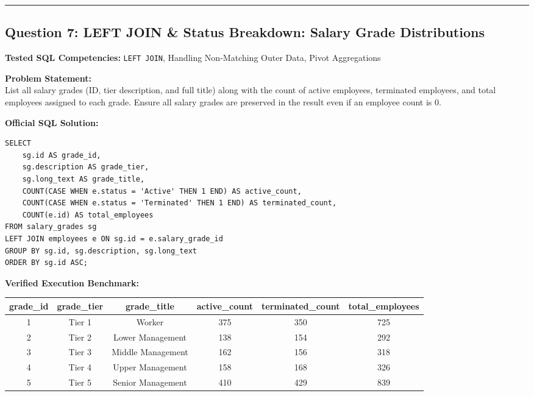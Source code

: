 \documentclass[11pt,a4paper]{article}
\begin{document}
\vspace{0.4cm}
\noindent\rule{\textwidth}{0.4pt}
\vspace{0.4cm}

\subsection*{Question 7: LEFT JOIN & Status Breakdown: Salary Grade Distributions}

\noindent\textbf{Tested SQL Competencies:} \texttt{LEFT JOIN}, Handling Non-Matching Outer Data, Pivot Aggregations

\vspace{0.15cm}
\noindent\textbf{Problem Statement:} \\
List all salary grades (ID, tier description, and full title) along with the count of active employees, terminated employees, and total employees assigned to each grade. Ensure all salary grades are preserved in the result even if an employee count is 0.

\vspace{0.25cm}
\noindent\textbf{Official SQL Solution:}
\begin{verbatim}
SELECT 
    sg.id AS grade_id,
    sg.description AS grade_tier,
    sg.long_text AS grade_title,
    COUNT(CASE WHEN e.status = 'Active' THEN 1 END) AS active_count,
    COUNT(CASE WHEN e.status = 'Terminated' THEN 1 END) AS terminated_count,
    COUNT(e.id) AS total_employees
FROM salary_grades sg
LEFT JOIN employees e ON sg.id = e.salary_grade_id
GROUP BY sg.id, sg.description, sg.long_text
ORDER BY sg.id ASC;
\end{verbatim}

\vspace{0.15cm}
\noindent\textbf{Verified Execution Benchmark:}
\begin{center}
\small
\begin{tabular}{cccccc}
\toprule
\textbf{grade\_id} & \textbf{grade\_tier} & \textbf{grade\_title} & \textbf{active\_count} & \textbf{terminated\_count} & \textbf{total\_employees} \\
\midrule
1 & Tier 1 & Worker & 375 & 350 & 725 \\
2 & Tier 2 & Lower Management & 138 & 154 & 292 \\
3 & Tier 3 & Middle Management & 162 & 156 & 318 \\
4 & Tier 4 & Upper Management & 158 & 168 & 326 \\
5 & Tier 5 & Senior Management & 410 & 429 & 839 \\
\bottomrule
\end{tabular}
\end{center}
\end{document}
